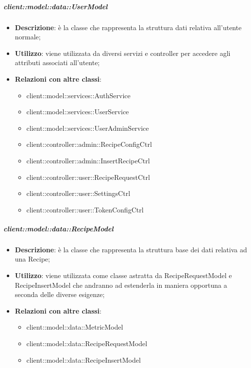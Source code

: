 		\subparagraph{client::model::data::UserModel} %
		\label{subp:client_model_data_user}
			\begin{itemize}
				\item \textbf{Descrizione}: è la classe che rappresenta la struttura dati relativa all'utente normale;
				\item \textbf{Utilizzo}: viene utilizzata da diversi servizi e controller per accedere agli attributi associati all'utente;
				\item \textbf{Relazioni con altre classi}:
					\begin{itemize}
						\item client::model::services::AuthService
						\item client::model::services::UserService
						\item client::model::services::UserAdminService
						\item client::controller::admin::RecipeConfigCtrl
						\item client::controller::admin::InsertRecipeCtrl
						\item client::controller::user::RecipeRequestCtrl
						\item client::controller::user::SettingsCtrl
						\item client::controller::user::TokenConfigCtrl
					\end{itemize}
			\end{itemize}

		\subparagraph{client::model::data::RecipeModel} %
		\label{subp:client_model_data_recipe}
			\begin{itemize}
				\item \textbf{Descrizione}: è la classe che rappresenta la struttura base dei dati relativa ad una Recipe;
				\item \textbf{Utilizzo}: viene utilizzata come classe astratta da RecipeRequestModel e RecipeInsertModel che andranno ad estenderla in maniera opportuna a seconda delle diverse esigenze;
				\item \textbf{Relazioni con altre classi}:
					\begin{itemize}
						\item client::model::data::MetricModel
						\item client::model::data::RecipeRequestModel
						\item client::model::data::RecipeInsertModel
					\end{itemize}
			\end{itemize}


